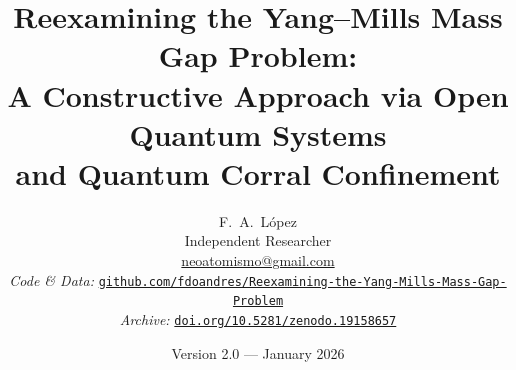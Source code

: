 \documentclass[12pt,a4paper]{article}
\theoremstyle{definition}
\newcommand{\zenodoDOI}{10.5281/zenodo.19158657}
\newcommand{\githubURL}{https://github.com/fdoandres/Reexamining-the-Yang-Mills-Mass-Gap-Problem}
\begin{document}
\title{\textbf{Reexamining the Yang--Mills Mass Gap Problem:}\\[4pt]
  \large A Constructive Approach via Open Quantum Systems\\
  and Quantum Corral Confinement}

\author{%
  F.~A.~L\'opez\\[4pt]
  \small Independent Researcher\\
  \small \href{mailto:neoatomismo@gmail.com}{neoatomismo@gmail.com}\\[6pt]
  \small \textit{Code \& Data:}
  \href{\githubURL}{\texttt{github.com/fdoandres/Reexamining-the-Yang-Mills-Mass-Gap-Problem}}\\
  \small \textit{Archive:}
  \href{https://doi.org/\zenodoDOI}{\texttt{doi.org/\zenodoDOI}}
}

\date{Version 2.0 — January 2026}
\maketitle
\end{document}
